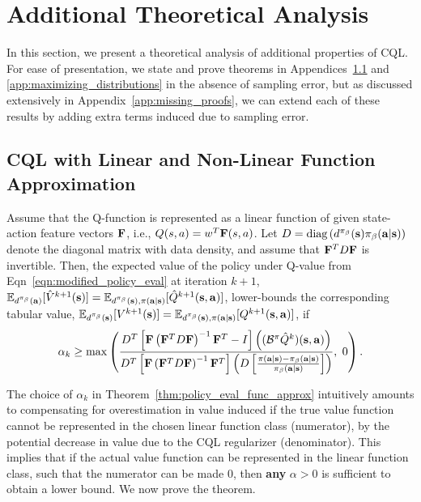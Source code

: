 \section{Additional Theoretical Analysis}
\label{app:additional_theory}
In this section, we present a theoretical analysis of additional properties of CQL. For ease of presentation, we state and prove theorems in Appendices~\ref{app:cql_linear_non_linear} and \ref{app:maximizing_distributions} in the absence of sampling error, but as discussed extensively in Appendix~\ref{app:missing_proofs}, we can extend each of these results by adding extra terms induced due to sampling error. 

\subsection{CQL with Linear and Non-Linear Function Approximation}
\label{app:cql_linear_non_linear}
\begin{theorem}
\label{thm:policy_eval_func_approx}
Assume that the Q-function is represented as a linear function of given state-action feature vectors $\mathbf{F}$, i.e., $Q(s, a) = w^T \mathbf{F}(s, a)$. Let $D = \text{diag}\left(d^{\pi_\beta}(\mathbf{s}) {\pi_\beta}(\mathbf{a}|\mathbf{s})\right)$ denote the diagonal matrix with data density, and assume that $\mathbf{F}^T D \mathbf{F}$ is invertible. Then, the expected value of the policy under Q-value from Eqn~\ref{eqn:modified_policy_eval} at iteration $k+1$, $\mathbb{E}_{d^{\pi_\beta}(\mathbf{a})}[\hat{V}^{k+1}(\mathbf{s})] = \mathbb{E}_{d^{\pi_\beta}(\mathbf{s}), \pi(\mathbf{a}|\mathbf{s})}[\hat{Q}^{k+1}(\mathbf{s}, \mathbf{a})]$, lower-bounds the corresponding tabular value, $\mathbb{E}_{d^{\pi_\beta}(\mathbf{s})}[V^{k+1}(\mathbf{s})] =\mathbb{E}_{d^{\pi_\beta}(\mathbf{s}), \pi(\mathbf{a}|\mathbf{s})}[Q^{k+1}(\mathbf{s}, \mathbf{a})]$, if
\begin{equation*}
\small{\alpha_k \geq \max \left(\frac{D^T\left[\mathbf{F}\left(\mathbf{F}^T D \mathbf{F}\right)^{-1} \mathbf{F}^T - I \right]\left((\mathcal{B}^\pi\hat{Q}^k)(\mathbf{s}, \mathbf{a})\right)}{D^T\left[ \mathbf{F}\left(\mathbf{F}^T D \mathbf{F}\right)^{-1} \mathbf{F}^T \right] \left(D \left[\frac{\pi(\mathbf{a}|\mathbf{s}) - {\pi_\beta}(\mathbf{a}|\mathbf{s})}{{\pi_\beta}(\mathbf{a}|\mathbf{s})} \right] \right)},~ 0 \right).}
\end{equation*}
\end{theorem}
The choice of $\alpha_k$ in Theorem~\ref{thm:policy_eval_func_approx} intuitively amounts to compensating for overestimation in value induced if the true value function cannot be represented in the chosen linear function class (numerator), by the potential decrease in value due to the CQL regularizer (denominator). This implies that if the actual value function can be represented in the linear function class, such that the numerator can be made $0$, then \textbf{any} $\alpha > 0$ is sufficient to obtain a lower bound. We now prove the theorem.


